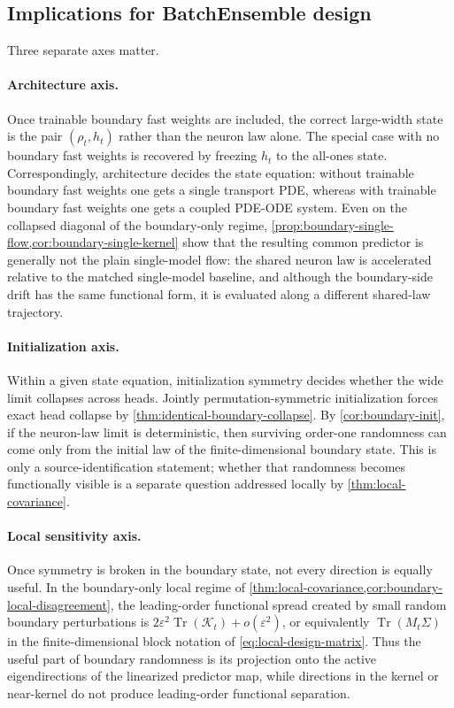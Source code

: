 \documentclass[11pt]{article}
\theoremstyle{definition}
\begin{document}
\subsection{Implications for BatchEnsemble design}

Three separate axes matter.

\paragraph{Architecture axis.}
Once trainable boundary fast weights are included, the correct large-width state
is the pair $(\rho_t,h_t)$ rather than the neuron law alone. The special case
with no boundary fast weights is recovered by freezing $h_t$ to the all-ones
state. Correspondingly, architecture decides the state equation: without
trainable boundary fast weights one gets a single transport PDE, whereas with
trainable boundary fast weights one gets a coupled PDE-ODE system. Even on the
collapsed diagonal of the boundary-only regime, \cref{prop:boundary-single-flow,cor:boundary-single-kernel}
show that the resulting common predictor is generally not the plain
single-model flow: the shared neuron law is accelerated relative to the matched
single-model baseline, and although the boundary-side drift has the same
functional form, it is evaluated along a different shared-law trajectory.

\paragraph{Initialization axis.}
Within a given state equation, initialization symmetry decides whether the wide
limit collapses across heads. Jointly permutation-symmetric initialization
forces exact head collapse by \cref{thm:identical-boundary-collapse}. By
\cref{cor:boundary-init}, if the neuron-law limit is deterministic, then
surviving order-one randomness can come only from the initial law of the
finite-dimensional boundary state. This is only a source-identification
statement; whether that randomness becomes functionally visible is a separate
question addressed locally by \cref{thm:local-covariance}.

\paragraph{Local sensitivity axis.}
Once symmetry is broken in the boundary state, not every direction is equally
useful. In the boundary-only local regime of
\cref{thm:local-covariance,cor:boundary-local-disagreement}, the leading-order
functional spread created by small random boundary perturbations is
$2\varepsilon^2\operatorname{Tr}(\mathcal K_t)+o(\varepsilon^2)$, or
equivalently $\operatorname{Tr}(M_t\Sigma)$ in the finite-dimensional block
notation of \cref{eq:local-design-matrix}. Thus the useful part of boundary
randomness is its projection onto the active eigendirections of the linearized
predictor map, while directions in the kernel or near-kernel do not produce
leading-order functional separation.
\end{document}
